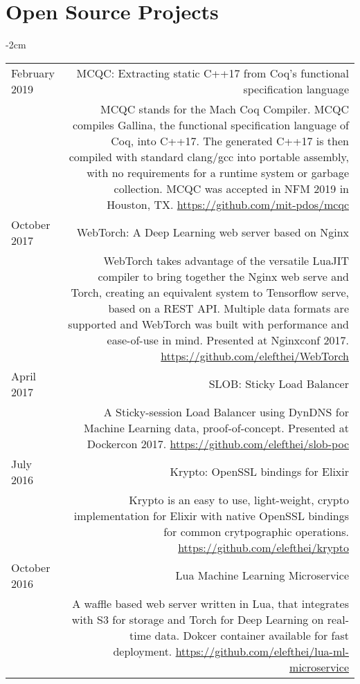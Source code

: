 \documentclass[lettersize,10pt]{article}
\begin{document}
\section{Open Source Projects}
\begin{adjustwidth}{}{-2cm}
  \begin{tabularx}{\textwidth}{L R}
    February 2019 & {\sc MCQC: Extracting static C++17 from Coq's functional specification language} \\
    & MCQC stands for the Mach Coq Compiler. MCQC compiles Gallina, the functional specification language of Coq, into C++17.
    The generated C++17 is then compiled with standard clang/gcc into portable assembly, with no requirements for a runtime system
    or garbage collection. MCQC was accepted in NFM 2019 in Houston, TX. \url{https://github.com/mit-pdos/mcqc} \\

    October 2017 & {\sc WebTorch: A Deep Learning web server based on Nginx} \\
    & WebTorch takes advantage of the versatile LuaJIT compiler to bring together the Nginx web serve and Torch, creating an equivalent
    system to Tensorflow serve, based on a REST API. Multiple data formats are supported and WebTorch was built with
    performance and ease-of-use in mind. Presented at Nginxconf 2017. \url{https://github.com/elefthei/WebTorch} \\

    April 2017 & {\sc SLOB: Sticky Load Balancer} \\
    & A Sticky-session Load Balancer using DynDNS for Machine Learning data, proof-of-concept. Presented at Dockercon 2017.
    \url{https://github.com/elefthei/slob-poc} \\

    July 2016 & {\sc Krypto: OpenSSL bindings for Elixir} \\
    & Krypto is an easy to use, light-weight, crypto implementation for Elixir with native OpenSSL bindings for common
    crytpographic operations. \url{https://github.com/elefthei/krypto} \\

    October 2016 & {\sc Lua Machine Learning Microservice} \\
    & A waffle based web server written in Lua, that integrates with S3 for storage and Torch for Deep Learning on real-time data.
    Dokcer container available for fast deployment. \url{https://github.com/elefthei/lua-ml-microservice} \\


\end{tabularx}
\end{adjustwidth}
\end{document}
